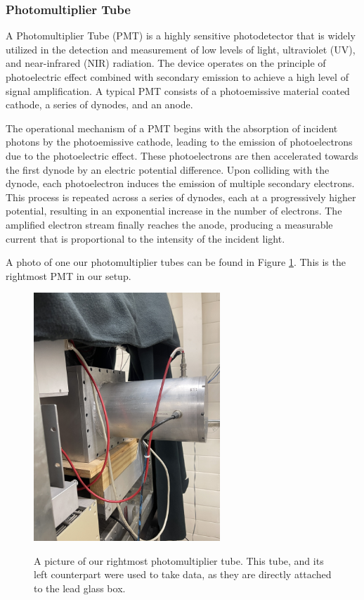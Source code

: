 \documentclass[10pt,letterpaper,onecolumn]{article}
\begin{document}
\subsubsection{Photomultiplier Tube}

A Photomultiplier Tube (PMT) is a highly sensitive photodetector that is widely utilized in the detection and measurement of low levels of light, ultraviolet (UV), and near-infrared (NIR) radiation. The device operates on the principle of photoelectric effect combined with secondary emission to achieve a high level of signal amplification. A typical PMT consists of a photoemissive material coated cathode, a series of dynodes, and an anode.


The operational mechanism of a PMT begins with the absorption of incident photons by the photoemissive cathode, leading to the emission of photoelectrons due to the photoelectric effect. These photoelectrons are then accelerated towards the first dynode by an electric potential difference. Upon colliding with the dynode, each photoelectron induces the emission of multiple secondary electrons. This process is repeated across a series of dynodes, each at a progressively higher potential, resulting in an exponential increase in the number of electrons. The amplified electron stream finally reaches the anode, producing a measurable current that is proportional to the intensity of the incident light. 

A photo of one our photomultiplier tubes can be found in Figure \ref{fig:rightpmt}. This is the rightmost PMT in our setup.

\begin{figure}[hbt!]
    \begin{center}
        {{\includegraphics[width=7cm, angle = 270]{Apparatus001.JPG} }}%
        \caption{A picture of our rightmost photomultiplier tube. This tube, and its left counterpart were used to take data, as they are directly attached to the lead glass box.}%
        \label{fig:rightpmt}%
    \end{center}
\end{figure}
\end{document}
